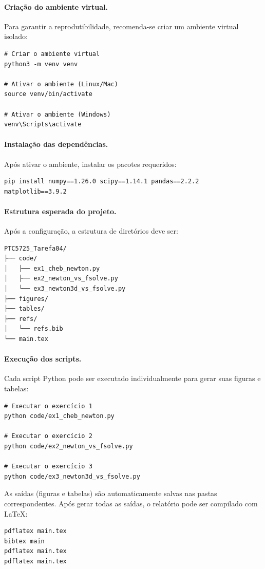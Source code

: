 \documentclass[12pt,a4paper]{article}
\begin{document}
\paragraph{Criação do ambiente virtual.}
Para garantir a reprodutibilidade, recomenda-se criar um ambiente virtual isolado:

\begin{verbatim}
# Criar o ambiente virtual
python3 -m venv venv

# Ativar o ambiente (Linux/Mac)
source venv/bin/activate

# Ativar o ambiente (Windows)
venv\Scripts\activate
\end{verbatim}

\paragraph{Instalação das dependências.}
Após ativar o ambiente, instalar os pacotes requeridos:

\begin{verbatim}
pip install numpy==1.26.0 scipy==1.14.1 pandas==2.2.2 matplotlib==3.9.2
\end{verbatim}

\paragraph{Estrutura esperada do projeto.}
Após a configuração, a estrutura de diretórios deve ser:

\begin{verbatim}
PTC5725_Tarefa04/
├── code/
│   ├── ex1_cheb_newton.py
│   ├── ex2_newton_vs_fsolve.py
│   └── ex3_newton3d_vs_fsolve.py
├── figures/
├── tables/
├── refs/
│   └── refs.bib
└── main.tex
\end{verbatim}

\paragraph{Execução dos scripts.}
Cada script Python pode ser executado individualmente para gerar suas figuras e tabelas:

\begin{verbatim}
# Executar o exercício 1
python code/ex1_cheb_newton.py

# Executar o exercício 2
python code/ex2_newton_vs_fsolve.py

# Executar o exercício 3
python code/ex3_newton3d_vs_fsolve.py
\end{verbatim}

As saídas (figuras e tabelas) são automaticamente salvas nas pastas correspondentes.  
Após gerar todas as saídas, o relatório pode ser compilado com \LaTeX:

\begin{verbatim}
pdflatex main.tex
bibtex main
pdflatex main.tex
pdflatex main.tex
\end{verbatim}



\end{document}
